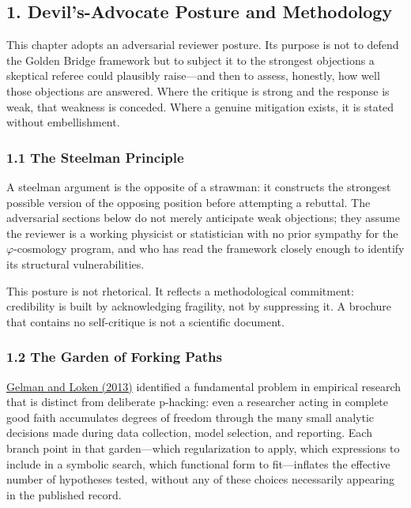 
\subsection{1. Devil's-Advocate Posture and Methodology}

This chapter adopts an adversarial reviewer posture. Its purpose is not to defend the Golden Bridge framework but to subject it to the strongest objections a skeptical referee could plausibly raise---and then to assess, honestly, how well those objections are answered. Where the critique is strong and the response is weak, that weakness is conceded. Where a genuine mitigation exists, it is stated without embellishment.

\subsubsection{1.1 The Steelman Principle}

A steelman argument is the opposite of a strawman: it constructs the strongest possible version of the opposing position before attempting a rebuttal. The adversarial sections below do not merely anticipate weak objections; they assume the reviewer is a working physicist or statistician with no prior sympathy for the $\varphi$-cosmology program, and who has read the framework closely enough to identify its structural vulnerabilities.

This posture is not rhetorical. It reflects a methodological commitment: credibility is built by acknowledging fragility, not by suppressing it. A brochure that contains no self-critique is not a scientific document.

\subsubsection{1.2 The Garden of Forking Paths}

\href{https://sites.stat.columbia.edu/gelman/research/unpublished/forking.pdf}{Gelman and Loken (2013)} identified a fundamental problem in empirical research that is distinct from deliberate p-hacking: even a researcher acting in complete good faith accumulates degrees of freedom through the many small analytic decisions made during data collection, model selection, and reporting. Each branch point in that garden---which regularization to apply, which expressions to include in a symbolic search, which functional form to fit---inflates the effective number of hypotheses tested, without any of these choices necessarily appearing in the published record.

